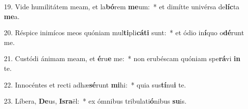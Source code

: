 19. Vide humilitátem meam, et la\textbf{bó}rem \textbf{me}um:~*  et dimítte univérsa de\textbf{líc}ta \textbf{me}a.\

20. Réspice inimícos meos quóniam mul\textbf{ti}pli\textbf{cá}\textbf{ti} sunt:~*  et ódio in\textbf{í}quo o\textbf{dé}runt me.\

21. Custódi ánimam meam, et \textbf{é}ru\textbf{e} me:~*  non erubéscam quóniam spe\textbf{rá}vi \textbf{in} te.\

22. Innocéntes et recti adhæ\textbf{sé}runt \textbf{mi}hi:~*  quia sus\textbf{tí}nu\textbf{i} te.\

23. Líbera, \textbf{De}us, \textbf{Is}\textbf{ra}ël:~*  ex ómnibus tribulati\textbf{ó}nibus \textbf{su}is.\

